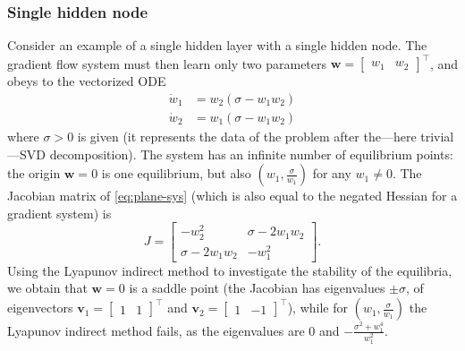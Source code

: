 \documentclass{article}
\newcommand{\1}{\mathds{1}}
\newcommand{\beq}{\begin{equation}}
\newcommand{\eeq}{\end{equation}}
\begin{document}
\subsubsection{Single hidden node}
\label{sec:1-node-1-layer}
Consider an example of a single hidden layer with a single hidden node. The gradient flow system must then learn only two parameters $ \bm{w} = \begin{bmatrix} w_1 & w_2\end{bmatrix}^\top$, and obeys to the vectorized ODE
\beq
\label{eq:plane-sys}
\begin{split}
\dot w_1 & = w_2 (\sigma  - w_1 w_2) \\
\dot w_2 & = w_1 (\sigma - w_1 w_2)
\end{split}
\eeq
where $ \sigma>0$ is given (it represents the data of the problem after the---here trivial---SVD decomposition). 
The system has an infinite number of equilibrium points: the origin $ \bm{w}=0 $ is one equilibrium, but also $ \left( w_1, \frac{\sigma}{w_1} \right) $ for any $ w_1 \neq 0$. 
The Jacobian matrix of \eqref{eq:plane-sys} (which is also equal to the negated Hessian for a gradient system) is 
\[
J = \begin{bmatrix} - w_2^2 & \sigma - 2 w_1 w_2 \\ \sigma - 2 w_1 w_2 & - w_1^2 \end{bmatrix}.
\]
Using the Lyapunov indirect method to investigate the stability of the equilibria, we obtain that $ \bm{w}=0 $ is a saddle point (the Jacobian has eigenvalues $ \pm \sigma$, of eigenvectors $ \bm{v}_1 = \begin{bmatrix}1 & 1 \end{bmatrix}^\top $ and $ \bm{v}_2 = \begin{bmatrix} 1 & -1 \end{bmatrix}^\top $), while for $ \left( w_1, \frac{\sigma}{w_1} \right) $ the Lyapunov indirect method fails, as the eigenvalues are $ 0$ and $ -\frac{\sigma^2 + w_1^4}{w_1^2} $. 
\end{document}
